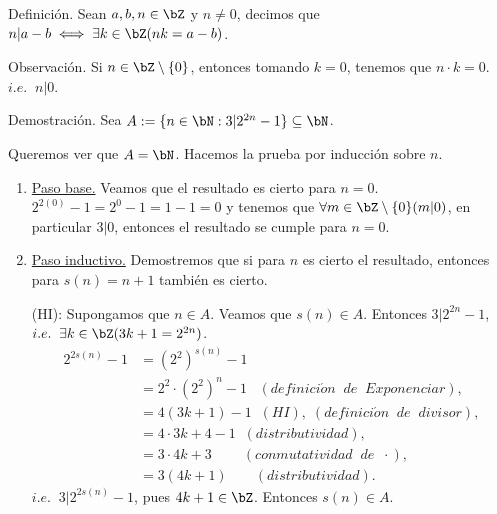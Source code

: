 \documentclass[letterpaper,11pt]{article}
\begin{document}
  Definición. Sean $a, b, n \in \bZ$ y $n \neq 0$, decimos que $n | a - b \iff \exists k \in \bZ(nk = a - b)$. \newline

  Observación. Si $n \in \bZ \setminus \{ 0 \}$, entonces tomando $k = 0$,
  tenemos que $n \cdot k = 0$. $i.e. \;\; n | 0$. \newline

  Demostración. Sea $A := \{ n \in \bN : 3 | 2^{2n} - 1 \} \subseteq \bN$.

  Queremos ver que $A = \bN$. Hacemos la prueba por inducción sobre $n$.

  \begin{adjustwidth}{1cm}{0cm}
    \begin{enumerate}[1.]
      \item \underline{Paso base.} Veamos que el resultado es cierto para $n = 0$. \newline
        $2^{2(0)} - 1 = 2^0 - 1 = 1 - 1 = 0$ y tenemos que $\forall m \in \bZ \setminus \{ 0 \}(m | 0)$,
        en particular $3 | 0$, entonces el resultado se cumple para $n = 0$.
      \item \underline{Paso inductivo.} Demostremos que si para $n$ es cierto el resultado,
       entonces para $s(n) = n + 1$ también es cierto. \newline

      (HI): Supongamos que $n \in A$. Veamos que $s(n) \in A$. \newline
      Entonces $3 | 2^{2n} - 1$, $i.e. \;\; \exists k \in \bZ (3k + 1 = 2^{2n})$.
      \begin{align*}
        2^{2s(n)} - 1 &= (2^2)^{s(n)} - 1  \;\;\;\;\;\;  \\
        &= 2^2 \cdot (2^2)^{n} - 1  \;\;\;  (definici\acute{o}n \;\; de \;\; Exponenciar), \\
        &= 4(3k + 1) - 1  \;\; (HI), \; (definici\acute{o}n \;\; de \;\; divisor), \\
        &= 4 \cdot 3 k + 4 - 1  \;\; (distributividad), \\
        &= 3 \cdot 4 k + 3  \;\;\;\;\;\;\;\; (conmutatividad \;\; de \;\; \cdot), \\
        &= 3(4k + 1)  \;\;\;\;\;\;\; (distributividad).
      \end{align*}
      $i.e. \;\; 3 | 2^{2s(n)} - 1$, pues $4k + 1 \in \bZ$. \newline
      Entonces $s(n) \in A$.
    \end{enumerate}
  \end{adjustwidth}
\end{document}
